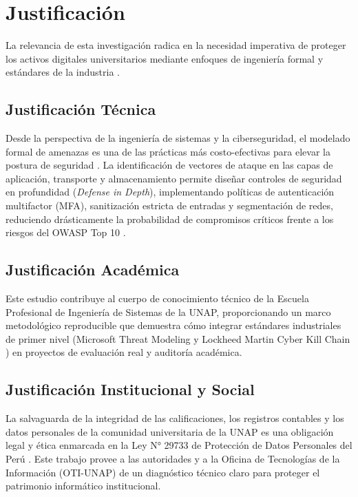 \chapter{Justificación}
\label{ch:justificacion}

La relevancia de esta investigación radica en la necesidad imperativa de proteger los activos digitales universitarios mediante enfoques de ingeniería formal y estándares de la industria \citep{iso202227001,nist2018cybersecurity}.

\section{Justificación Técnica}
Desde la perspectiva de la ingeniería de sistemas y la ciberseguridad, el modelado formal de amenazas es una de las prácticas más costo-efectivas para elevar la postura de seguridad \citep{howard2003writing,shostack2014threat}. La identificación de vectores de ataque en las capas de aplicación, transporte y almacenamiento permite diseñar controles de seguridad en profundidad (\textit{Defense in Depth}), implementando políticas de autenticación multifactor (MFA), sanitización estricta de entradas y segmentación de redes, reduciendo drásticamente la probabilidad de compromisos críticos frente a los riesgos del OWASP Top 10 \citep{owasp2021top10}.

\section{Justificación Académica}
Este estudio contribuye al cuerpo de conocimiento técnico de la Escuela Profesional de Ingeniería de Sistemas de la UNAP, proporcionando un marco metodológico reproducible que demuestra cómo integrar estándares industriales de primer nivel (Microsoft Threat Modeling \citep{kohnfelder1999threats} y Lockheed Martin Cyber Kill Chain \citep{hutchins2011intelligence}) en proyectos de evaluación real y auditoría académica.

\section{Justificación Institucional y Social}
La salvaguarda de la integridad de las calificaciones, los registros contables y los datos personales de la comunidad universitaria de la UNAP es una obligación legal y ética enmarcada en la Ley N° 29733 de Protección de Datos Personales del Perú \citep{peru2011ley29733}. Este trabajo provee a las autoridades y a la Oficina de Tecnologías de la Información (OTI-UNAP) de un diagnóstico técnico claro para proteger el patrimonio informático institucional.
